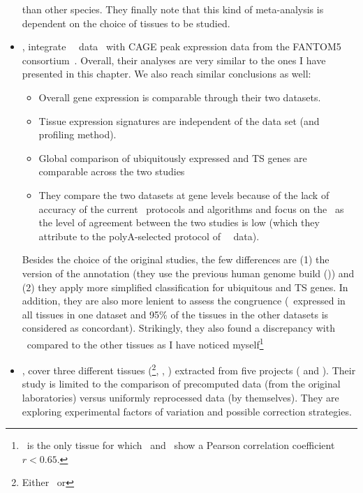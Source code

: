 \begin{itemize}[topsep=0pt,nosep]
than other species.
They finally note that this kind of meta-analysis is dependent on
the choice of tissues to be studied.
\item\hspace{-1mm}, integrate \uhlen\ \etal\ data~
with \gls{CAGE} peak expression data from the \gls{FANTOM5}
consortium~.
Overall, their analyses are very similar to the ones I have presented in this
chapter.
We also reach similar conclusions as well:
\begin{itemize}[nosep,topsep=0pt]
\item Overall gene expression is comparable through their two datasets.
\item Tissue expression signatures are independent of the data set (and profiling method).
\item Global comparison of ubiquitously expressed and \gls{TS} genes are comparable
    across the two studies
\item They compare the two datasets at gene levels because of the lack of accuracy
    of the current \Rnaseq\ protocols and algorithms and focus on the \pcgs\
    as the level of agreement between the two studies is low
    (which they attribute to the polyA-selected protocol of \uhlen\ \etal\ data).
\end{itemize}
Besides the choice of the original studies,
the few differences are (1) the version of the annotation
(they use the previous human genome build ()) and
(2) they apply more simplified classification for ubiquitous and \gls{TS} genes.
In addition, they are also more lenient to assess the congruence
(\eg\ expressed in all tissues
in one dataset and 95\% of the tissues in the other datasets is considered as
concordant).
Strikingly, they also found a discrepancy with \salivary\ compared to the other tissues
as I have noticed myself\footnote{\salivary\
is the only tissue for which \uhlen\ and \gtex\ show a Pearson correlation coefficient
$r<0.65$.}
\item\hspace{-1mm}, cover three different tissues
(\brain{}\footnote{Either \cortex\ or \hypothalamus}, \heart, \kidney)
extracted from five projects (\cite{Burge,VTpaper,Uhlen2015,Krupp2012} and \ibm).
Their study is limited to
the comparison of precomputed data (from the original laboratories)
versus uniformly reprocessed data (by themselves).
They are exploring experimental factors of variation and possible correction strategies.

\end{itemize}
